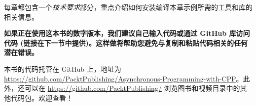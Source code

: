 每章都包含一个\textit{技术要求}部分，重点介绍如何安装编译本章示例所需的工具和库的相关信息。

\textbf{如果正在使用这本书的数字版本，我们建议自己输入代码或通过 GitHub 库访问代码 (链接在下一节中提供)。这样做将帮助您避免与复制和粘贴代码相关的任何潜在错误。}


本书的代码托管在 GitHub 上，地址为 \url{https://github.com/PacktPublishing/Asynchronous-Programming-with-CPP}。此外，还可以在 \url{https://github.com/PacktPublishing/} 浏览图书和视频目录中的其他代码包。欢迎查看！
